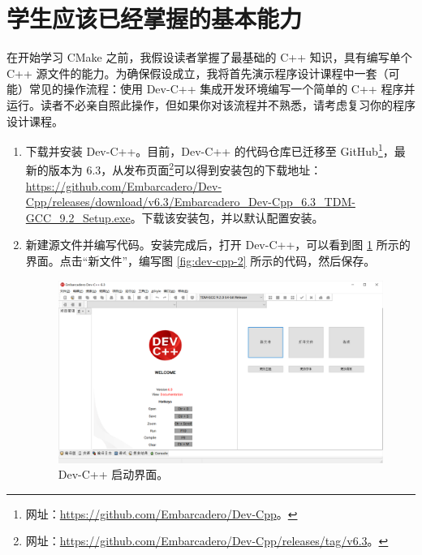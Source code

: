 
\section{学生应该已经掌握的基本能力}

在开始学习 CMake 之前，我假设读者掌握了最基础的 C++ 知识，具有编写单个 C++ 源文件的能力。为确保假设成立，我将首先演示程序设计课程中一套（可能）常见的操作流程：使用 Dev-C++ 集成开发环境编写一个简单的 C++ 程序并运行。读者不必亲自照此操作，但如果你对该流程并不熟悉，请考虑复习你的程序设计课程。

\begin{enumerate}
	\item 下载并安装 Dev-C++。目前，Dev-C++ 的代码仓库已迁移至 GitHub\footnote{网址：\url{https://github.com/Embarcadero/Dev-Cpp}。}，最新的版本为 6.3，从发布页面\footnote{网址：\url{https://github.com/Embarcadero/Dev-Cpp/releases/tag/v6.3}。}可以得到安装包的下载地址：\url{https://github.com/Embarcadero/Dev-Cpp/releases/download/v6.3/Embarcadero_Dev-Cpp_6.3_TDM-GCC_9.2_Setup.exe}。下载该安装包，并以默认配置安装。

	\item 新建源文件并编写代码。安装完成后，打开 Dev-C++，可以看到图 \ref{fig:dev-cpp-1} 所示的界面。点击“新文件”，编写图 \ref{fig:dev-cpp-2} 所示的代码，然后保存。

	\begin{figure}
		\centering
		\includegraphics[width=\linewidth]{assets/dev-cpp-1}
		\caption{Dev-C++ 启动界面。}
		\label{fig:dev-cpp-1}
	\end{figure}


\end{enumerate}
